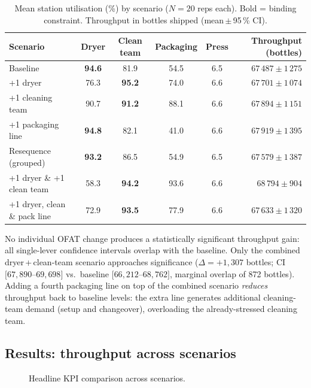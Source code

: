 \begin{table}[H]
\centering
\caption{Mean station utilisation (\%) by scenario ($N=20$ reps each).
         Bold = binding constraint. Throughput in bottles shipped (mean\,$\pm$\,95\,\% CI).}
\label{tab:btshift}
\small
\begin{tabularx}{\textwidth}{l c c c c r}
\toprule
Scenario & Dryer & Clean team & Packaging & Press &
  Throughput (bottles) \\
\midrule
Baseline
  & \textbf{94.6} & 81.9 & 54.5 & 6.5
  & $67\,487 \pm 1\,275$ \\
+1 dryer
  & 76.3 & \textbf{95.2} & 74.0 & 6.6
  & $67\,701 \pm 1\,074$ \\
+1 cleaning team
  & 90.7 & \textbf{91.2} & 88.1 & 6.6
  & $67\,894 \pm 1\,151$ \\
+1 packaging line
  & \textbf{94.8} & 82.1 & 41.0 & 6.6
  & $67\,919 \pm 1\,395$ \\
Resequence (grouped)
  & \textbf{93.2} & 86.5 & 54.9 & 6.5
  & $67\,579 \pm 1\,387$ \\
\midrule
+1 dryer \& +1 clean team
  & 58.3 & \textbf{94.2} & 93.6 & 6.6
  & $68\,794 \pm 904$ \\
+1 dryer, clean \& pack line
  & 72.9 & \textbf{93.5} & 77.9 & 6.6
  & $67\,633 \pm 1\,320$ \\
\bottomrule
\end{tabularx}
\end{table}

No individual OFAT change produces a statistically significant throughput gain:
all single-lever confidence intervals overlap with the baseline. Only the
combined dryer\,+\,clean-team scenario approaches significance
($\Delta = +1{,}307$ bottles; CI $[67{,}890$--$69{,}698]$ vs.\ baseline
$[66{,}212$--$68{,}762]$, marginal overlap of 872 bottles).
Adding a fourth packaging line on top of the combined scenario \emph{reduces}
throughput back to baseline levels: the extra line generates additional
cleaning-team demand (setup and changeover), overloading the already-stressed
cleaning team.

\subsection{Results: throughput across scenarios}
\label{sec:expresults}
\begin{figure}[H]
\centering
{}
\caption{Headline KPI comparison across scenarios.}
\label{fig:expresults}
\end{figure}

